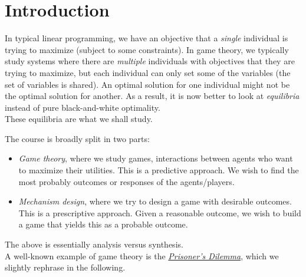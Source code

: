 \section{Introduction}

In typical linear programming, we have an objective that a \emph{single} individual is trying to maximize (subject to some constraints). In game theory, we typically study systems where there are \emph{multiple} individuals with objectives that they are trying to maximize, but each individual can only set some of the variables (the set of variables is shared). An optimal solution for one individual might not be the optimal solution for another. As a result, it is now better to look at \emph{equilibria} instead of pure black-and-white optimality.\\
These equilibria are what we shall study.

The course is broadly split in two parts:
\begin{itemize}
	\item \emph{Game theory}, where we study games, interactions between agents who want to maximize their utilities. This is a predictive approach. We wish to find the most probably outcomes or responses of the agents/players.
	\item \emph{Mechanism design}, where we try to design a game with desirable outcomes. This is a prescriptive approach. Given a reasonable outcome, we wish to build a game that yields this as a probable outcome.
\end{itemize}
The above is essentially analysis versus synthesis.\\

A well-known example of game theory is the \href{https://en.wikipedia.org/wiki/Prisoner%27s_dilemma}{\emph{Prisoner's Dilemma}}, which we slightly rephrase in the following.\\

